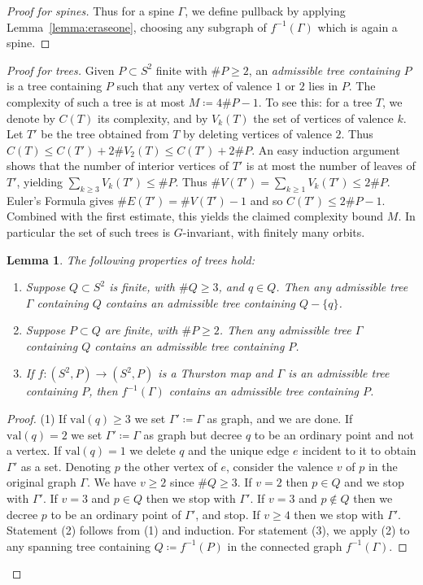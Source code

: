 \documentclass{amsart}
\newtheorem{lem}[thm]{Lemma}
\theoremstyle{definition}
\theoremstyle{remark}
\begin{document}
\begin{proof}[Proof for spines]
Thus for a spine $\Gamma$, we define pullback by applying Lemma~\ref{lemma:eraseone}, choosing any subgraph of $f^{-1}(\Gamma)$ which is again a spine.
\end{proof}

\begin{proof}[Proof for trees]
Given $P \subset S^2$ finite with $\#P \geq 2$, an \emph{admissible tree containing $P$} is a tree containing $P$ such that any vertex of valence $1$ or $2$ lies in $P$.  The complexity of such a tree is at most $M\coloneqq4\#P-1$.  To see this: for a tree $T$, we denote by $C(T)$ its complexity, and by $V_k(T)$ the set of vertices of valence $k$.  Let $T'$ be the tree obtained from $T$ by deleting vertices of valence $2$.  Thus $C(T) \leq C(T')+2\#V_2(T) \leq C(T')+2\#P$.  An easy induction argument shows that the number of interior vertices of $T'$ is at most the number of leaves of $T'$, yielding $\sum_{k \geq 3}V_k(T') \leq \#P$. Thus $\#V(T')=\sum_{k \geq 1}V_k(T') \leq 2\#P$. Euler's Formula gives $\#E(T')=\#V(T')-1$ and so $C(T') \leq 2\#P-1$. Combined with the first estimate, this yields the claimed complexity bound $M$. In particular  the set of such trees is $G$-invariant, with finitely many orbits. 

\begin{lem}\label{lem:trees}
  The following properties of trees hold:
\begin{enumerate}
\item Suppose $Q \subset S^2$ is finite, with $\#Q \geq 3$, and $q\in Q$. Then any admissible tree $\Gamma$ containing $Q$ contains an admissible tree containing $Q-\{q\}$. 
\item Suppose $P \subset Q$ are finite, with $\#P \geq 2$. Then any admissible tree $\Gamma$ containing $Q$ contains an admissible tree containing $P$.  
\item If $f\colon (S^2,P)\to (S^2,P)$ is a Thurston map and $\Gamma$ is an admissible tree containing $P$, then $f^{-1}(\Gamma)$ contains an admissible tree containing $P$.
\end{enumerate}
\end{lem}
\begin{proof}
  (1) If $\text{val}(q)\geq 3$ we set $\Gamma'\coloneqq\Gamma$ as graph, and we are done. If $\text{val}(q)=2$ we set $\Gamma'\coloneqq\Gamma$ as graph but decree $q$ to be an ordinary point and not a vertex. If $\text{val}(q)=1$ we delete $q$ and the unique edge $e$ incident to it to obtain $\Gamma'$ as a set.  Denoting $p$ the other vertex of $e$, consider the valence $v$ of $p$ in the original graph $\Gamma$. We have $v \geq 2$ since $\#Q \geq 3$. If $v=2$ then $p\in Q$ and we stop with $\Gamma'$. If $v=3$ and $p\in Q$ then we stop with $\Gamma'$. If $v=3$ and $p \not\in Q$ then we decree $p$ to be an ordinary point of $\Gamma'$, and stop. If $v \geq 4$ then we stop with $\Gamma'$. Statement (2) follows from (1) and induction.  For statement (3), we apply (2) to any spanning tree containing $Q\coloneqq f^{-1}(P)$ in the connected graph $f^{-1}(\Gamma)$. 
\end{proof}


\end{proof}
\end{document}
